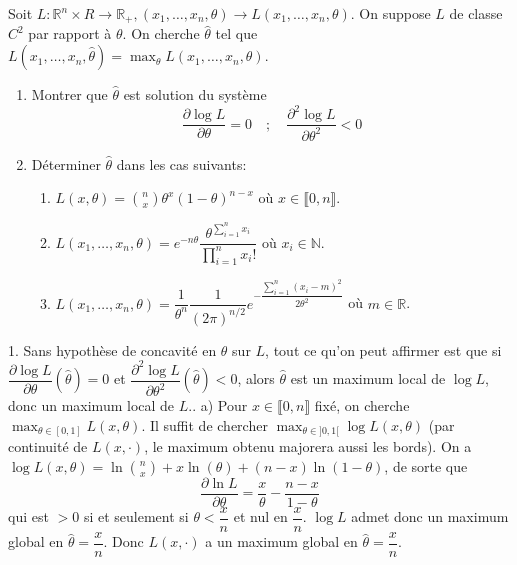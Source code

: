 \documentclass{fancybook}
\begin{document}
\begin{exercice}
Soit $L:\mathbb R^n \times R\to \mathbb R_+, (x_1,\ldots,x_n,\theta)\to L(x_1,\ldots,x_n,\theta)$.\newline
On suppose $L$ de classe $C^2$ par rapport à $\theta$. On cherche $\hat{\theta}$ tel que $L(x_1,\ldots,x_n,\hat{\theta})=\max_{\theta}L(x_1,\ldots,x_n,\theta)$.
\begin{enumerate}
\item Montrer que $\hat \theta$ est solution du système $$\dfrac{\partial \log L}{\partial \theta}=0 \quad;\quad   \dfrac{\partial^2 \log L}{\partial \theta^2}<0$$
\item Déterminer $\hat \theta$ dans les cas suivants:
\begin{enumerate}
\item $L(x,\theta)=\binom{n}x \theta^x (1-\theta)^{n-x}$ où $x\in \llbracket 0,n\rrbracket$.
\item $L(x_1,\ldots,x_n,\theta)=e^{-n\theta}\dfrac{\theta^{\sum_{i=1}^n x_i}}{\prod_{i=1}^n x_i!}$ où $x_i\in \mathbb N$.
\item $L(x_1,\ldots,x_n,\theta) = \dfrac{1}{\theta^n} \dfrac{1}{(2\pi )^{n/2}}e^{-\dfrac{\sum_{i=1}^n (x_i-m)^2}{2\theta^2}}$ où $m\in \mathbb R$.
\end{enumerate}
\end{enumerate}
\end{exercice}
1. Sans hypothèse de concavité en $\theta$ sur $L$, tout ce qu'on peut affirmer est que si $\dfrac{\partial \log L}{\partial \theta}(\hat \theta)=0$ et $\dfrac{\partial^2 \log L}{\partial \theta^2}(\hat \theta)<0$, alors $\hat \theta$ est un maximum local de $\log L$, donc un maximum local de $L$.. a) Pour $x\in \llbracket 0,n\rrbracket$ fixé, on cherche $\max_{\theta \in [0,1]}L(x,\theta)$. Il suffit de chercher $\max_{\theta \in ]0,1[}\log L(x,\theta)$ (par continuité de $L(x,\cdot)$, le maximum obtenu majorera aussi les bords).\newline
On a $\log L(x,\theta)=\ln\binom{n}{x} + x\ln(\theta) + (n-x)\ln(1-\theta)$, de sorte que $$\dfrac{\partial\ln L}{\partial \theta}=\dfrac{x}{\theta}- \dfrac{n-x}{1-\theta}$$
qui est $>0$ si et seulement si $\theta < \dfrac{x}{n}$ et nul en $\dfrac{x}{n}$. $\log L$ admet donc un maximum global en $\hat \theta=\dfrac{x}{n}$. \newline
Donc $L(x,\cdot)$ a un maximum global en $\hat \theta=\dfrac{x}{n}$.\newline 
\newline
\end{document}
